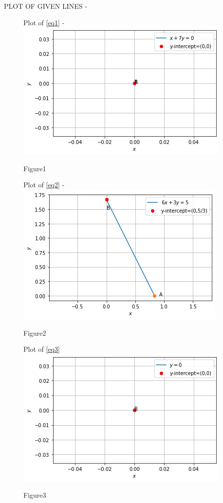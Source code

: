 \documentclass[journal,12pt,twocolumn]{IEEEtran}
\begin{document}
\begin{enumerate}
PLOT OF GIVEN LINES -
\begin{figure}[ht!]
Plot of \eqref{eq1} -
\centering
\includegraphics[width=\columnwidth]{Fig1.png}
\caption{Figure1}
\end{figure} 
\begin{figure}[ht!]
Plot of \eqref{eq2} -
\centering
\includegraphics[width=\columnwidth]{Fig2.png}
\caption{Figure2}
\end{figure} 
\begin{figure}[ht]
Plot of \eqref{eq3} 
\centering
\includegraphics[width=\columnwidth]{Fig3.png}
\caption{Figure3}
\end{figure}    
\end{enumerate}
\end{document}
